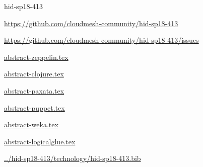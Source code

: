 \begin{IU}

hid-sp18-413

\url{https://github.com/cloudmesh-community/hid-sp18-413}

\url{https://github.com/cloudmesh-community/hid-sp18-413/issues}

\href{https://github.com/cloudmesh-community/hid-sp18-413/blob/master//technology/abstract-zeppelin.tex}{abstract-zeppelin.tex}

\href{https://github.com/cloudmesh-community/hid-sp18-413/blob/master//technology/abstract-clojure.tex}{abstract-clojure.tex}

\href{https://github.com/cloudmesh-community/hid-sp18-413/blob/master//technology/abstract-paxata.tex}{abstract-paxata.tex}

\href{https://github.com/cloudmesh-community/hid-sp18-413/blob/master//technology/abstract-puppet.tex}{abstract-puppet.tex}

\href{https://github.com/cloudmesh-community/hid-sp18-413/blob/master//technology/abstract-weka.tex}{abstract-weka.tex}

\href{https://github.com/cloudmesh-community/hid-sp18-413/blob/master//technology/abstract-logicalglue.tex}{abstract-logicalglue.tex}

\href{https://github.com/cloudmesh-community/hid-sp18-413/blob/master//technology/hid-sp18-413.bib}{../hid-sp18-413/technology/hid-sp18-413.bib}

\end{IU}


